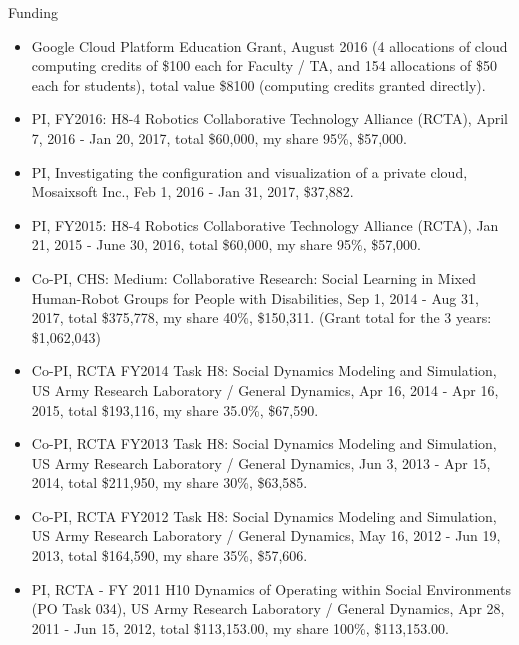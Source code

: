 \begin{category}{Funding}


\begin{itemize}

\item Google Cloud Platform Education Grant, August 2016 (4 allocations of cloud computing credits of \$100 each for Faculty / TA, and 154 allocations of \$50 each for students), total value \$8100 (computing credits granted directly).

\item PI, FY2016: H8-4 Robotics Collaborative Technology Alliance (RCTA), April 7, 2016 - Jan 20, 2017, total \$60,000, my share 95\%, \$57,000.

\item PI, Investigating the configuration and visualization of a private cloud, Mosaixsoft Inc., Feb 1, 2016 - Jan 31, 2017,
\$37,882.

\item PI, FY2015: H8-4 Robotics Collaborative Technology Alliance (RCTA), Jan 21, 2015 - June 30, 2016, total \$60,000, my share 95\%, \$57,000.

\item Co-PI, CHS: Medium: Collaborative Research: Social Learning in Mixed Human-Robot Groups for People with Disabilities, Sep 1, 2014 - Aug 31, 2017,
total \$375,778, my share 40\%, \$150,311. (Grant total for the 3 years: \$1,062,043)

\item Co-PI, RCTA FY2014 Task H8: Social Dynamics Modeling and Simulation, US Army Research Laboratory / General Dynamics, Apr 16, 2014 - Apr 16, 2015, total \$193,116, my share 35.0\%, \$67,590.

\item Co-PI, RCTA FY2013 Task H8: Social Dynamics Modeling and Simulation, US Army Research Laboratory / General Dynamics, Jun 3, 2013 - Apr 15, 2014,
total \$211,950, my share 30\%, \$63,585.

\item Co-PI, RCTA FY2012 Task H8: Social Dynamics Modeling and Simulation, US Army Research Laboratory / General Dynamics, May 16, 2012 - Jun 19, 2013, total \$164,590, my share 35\%, \$57,606.

\item PI, RCTA - FY 2011 H10 Dynamics of Operating within Social Environments (PO Task 034), US Army Research Laboratory / General Dynamics, Apr 28, 2011 - Jun 15, 2012, total \$113,153.00, my share 100\%, \$113,153.00.


\end{itemize}
\end{category}
